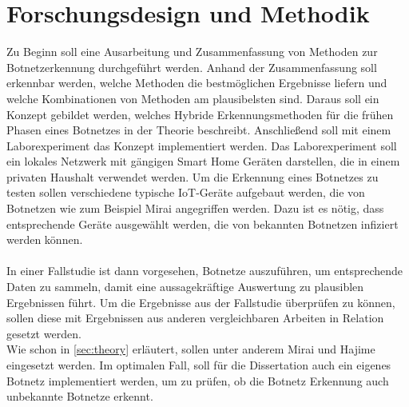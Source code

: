 \section{Forschungsdesign und Methodik}
\label{sec:methods}

Zu Beginn soll eine Ausarbeitung und Zusammenfassung von Methoden zur Botnetzerkennung durchgeführt werden. Anhand der Zusammenfassung soll 
erkennbar werden, welche Methoden die bestmöglichen Ergebnisse liefern und welche Kombinationen von Methoden am plausibelsten sind.
Daraus soll ein Konzept gebildet werden, welches Hybride Erkennungsmethoden für die frühen Phasen eines Botnetzes in der Theorie beschreibt.
Anschließend soll mit einem Laborexperiment das Konzept implementiert werden. Das Laborexperiment soll ein lokales Netzwerk mit gängigen Smart Home 
Geräten darstellen, die in einem privaten Haushalt verwendet werden. Um die Erkennung eines Botnetzes zu testen sollen verschiedene typische 
IoT-Geräte aufgebaut werden, die von Botnetzen wie zum Beispiel Mirai angegriffen werden. Dazu ist es nötig, dass entsprechende Geräte ausgewählt werden, 
die von bekannten Botnetzen infiziert werden können. \\ \\ In einer Fallstudie ist dann vorgesehen, Botnetze auszuführen, um entsprechende Daten
zu sammeln, damit eine aussagekräftige Auswertung zu plausiblen Ergebnissen führt. Um die Ergebnisse aus der Fallstudie überprüfen
zu können, sollen diese mit Ergebnissen aus anderen vergleichbaren Arbeiten in Relation gesetzt werden. \\ Wie schon in \ref{sec:theory}
erläutert, sollen unter anderem Mirai und Hajime eingesetzt werden. Im optimalen Fall, soll für die Dissertation auch ein eigenes Botnetz
implementiert werden, um zu prüfen, ob die Botnetz Erkennung auch unbekannte Botnetze erkennt.
